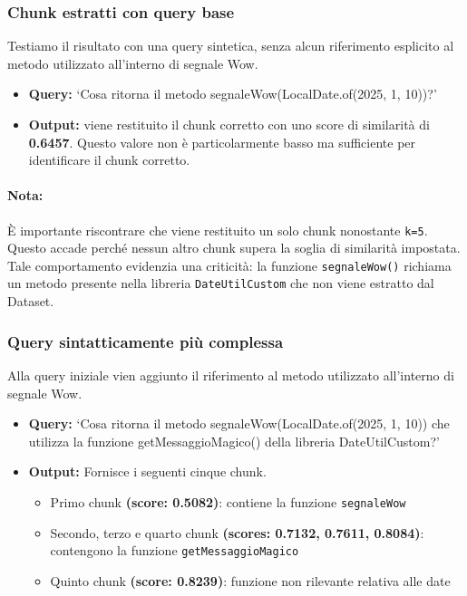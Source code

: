\documentclass[12pt,a4paper,openright,twoside]{book}
\begin{document}
    \subsubsection{Chunk estratti con query base}
    Testiamo il risultato con una query sintetica, senza alcun riferimento esplicito al metodo utilizzato all'interno di segnale Wow.
    \begin{itemize}
        \item \textbf{Query:} 
            `Cosa ritorna il metodo segnaleWow(LocalDate.of(2025, 1, 10))?'
        \item \textbf{Output:}
        viene restituito il chunk corretto con uno score di similarità di \textbf{0.6457}. Questo valore non è particolarmente basso ma sufficiente per identificare il chunk corretto.
    \end{itemize}
    \paragraph{Nota:}
    È importante riscontrare che viene restituito un solo chunk nonostante \texttt{k=5}.
    Questo accade perché nessun altro chunk supera la soglia di similarità impostata.
    Tale comportamento evidenzia una criticità: la funzione \texttt{segnaleWow()} richiama un metodo presente nella libreria \texttt{DateUtilCustom} che non viene estratto dal Dataset.

    \subsubsection{Query sintatticamente più complessa}
    Alla query iniziale vien aggiunto il riferimento al metodo utilizzato all'interno di segnale Wow.
        \begin{itemize}
            \item \textbf{Query:}
                `Cosa ritorna il metodo segnaleWow(LocalDate.of(2025, 1, 10)) che utilizza la funzione getMessaggioMagico() della libreria DateUtilCustom?'
            \item \textbf{Output:}
            Fornisce i seguenti cinque chunk.
            \begin{itemize}
                \item Primo chunk \textbf{(score: 0.5082)}: contiene la funzione \texttt{segnaleWow}
                \item Secondo, terzo e quarto chunk \textbf{(scores: 0.7132, 0.7611, 0.8084)}: contengono la funzione \texttt{getMessaggioMagico}
                \item Quinto chunk \textbf{(score: 0.8239)}: funzione non rilevante relativa alle date
            \end{itemize}
        \end{itemize}
\end{document}

